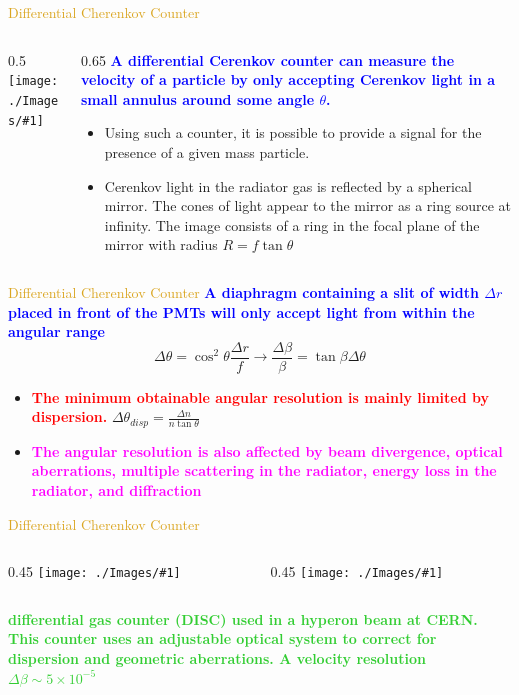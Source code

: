 \documentclass[11pt]{beamer} %
\renewcommand{\(}{\begin{columns}}
\renewcommand{\)}{\end{columns}}
\newcommand{\<}[1]{\begin{column}{#1}}
\renewcommand{\>}{\end{column}}
\newcommand{\itt}{\begin{itemize}}
\newcommand{\tti}{\end{itemize}}
\newcommand{\img}[1]{\texttt{[image: ./Images/\#1]}}
\newcommand{\hlt}[2]{\textcolor{#1}{\textbf{#2}}}
\begin{document}

\begin{frame}{\textcolor{Goldenrod}{Differential Cherenkov Counter}}
  \(
  \<{0.5\textwidth}
  \img{differential_cherenkov_detectors}
  \>
  \<{0.65\textwidth}
  \hlt{Blue}{A differential Cerenkov counter can measure the velocity of a particle
    by only accepting Cerenkov light in a small annulus around some angle
    $\theta$.}
  \itt
\item Using such a counter, it is possible to provide a signal for the
  presence of a given mass particle.
\item Cerenkov light in the radiator gas is reflected by a spherical
  mirror. The cones of light appear to the mirror as a ring source at
  infinity. The image consists of a ring in the focal plane of the mirror
  with radius $R = f\tan\theta$
  \tti
  \>
  \)
\end{frame}

\begin{frame}{\textcolor{Goldenrod}{Differential Cherenkov Counter}}
  \hlt{Blue}{A diaphragm containing a slit of width $\Delta r$  placed in front of the PMTs
  will only accept light from within the angular range}
  \[
    \Delta \theta =
    \cos^2\theta \frac{\Delta r}{f} \to \frac{\Delta \beta}{\beta} = \tan\beta\Delta\theta
  \]
  \itt
\item \hlt{Red}{The minimum obtainable angular resolution is mainly limited by
  dispersion.}
  $\Delta \theta_{disp} =  \frac{\Delta n}{n \tan\theta}$
  
\item \hlt{Magenta}{The angular resolution is also affected by beam divergence, optical
  aberrations, multiple scattering in the radiator, energy loss in the
  radiator, and diffraction}
  \tti  
\end{frame}

\begin{frame}{\textcolor{Goldenrod}{Differential Cherenkov Counter}}
  \(
  \<{0.45\textwidth}
  \img{differential_cherenkov_detectors_02}
  \>
  \<{0.45\textwidth}
  \img{differential_cherenkov_detectors_03}
  \>
  \)
  \hlt{LimeGreen}{differential gas counter (DISC) used in a hyperon beam at CERN. This
    counter uses an adjustable optical system to correct for dispersion
    and geometric aberrations. A velocity resolution $\Delta \beta \sim
    5\times 10^{-5}$}
\end{frame}
\end{document}
